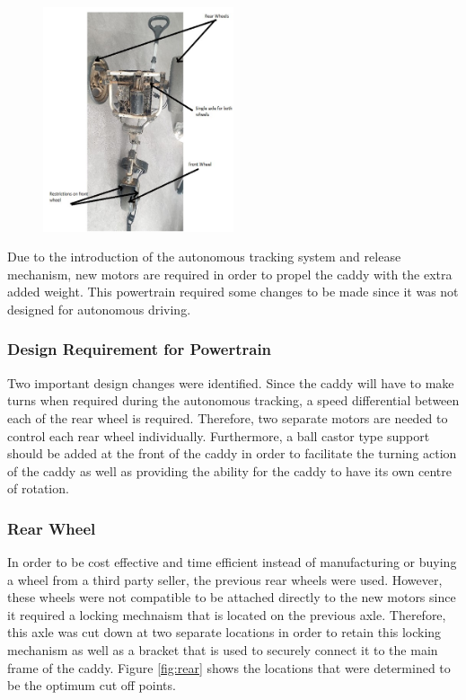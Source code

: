 \documentclass[11pt,landscape]{article}
\begin{document}
\begin{multicols}{2}
    \begin{figure}[H]
        \begin{center}
            \includegraphics[width=0.5\textwidth]{Figure25.jpg}
            \label{fig:train}
        \end{center}
    \end{figure}
    
    Due to the introduction of the autonomous tracking system and release
    mechanism, new motors are required in order to propel the caddy with the
    extra added weight. This powertrain required some changes to be made since
    it was not designed for autonomous driving.
    
    \subsubsection{Design Requirement for Powertrain}
    Two important design changes were identified. Since the caddy will have to
    make turns when required during the autonomous tracking, a speed
    differential between each of the rear wheel is required. Therefore, two
    separate motors are needed to control each rear wheel individually.
    Furthermore, a ball castor type support should be added at the front of the
    caddy in order to facilitate the turning action of the caddy as well as
    providing the ability for the caddy to have its own centre of rotation. 
    
    
    
    \subsubsection{Rear Wheel}
    In order to be cost effective and time efficient instead of manufacturing or
    buying a wheel from a third party seller, the previous rear wheels were
    used. However, these wheels were not compatible to be attached directly to
    the new motors since it required a locking mechnaism that is located on the
    previous axle. Therefore, this axle was cut down at two separate locations
    in order to retain this locking mechanism as well as a bracket that is used
    to securely connect it to the main frame of the caddy. Figure \ref{fig:rear}
    shows the locations that were determined to be the optimum cut off points.
    

\end{multicols}
\end{document}
